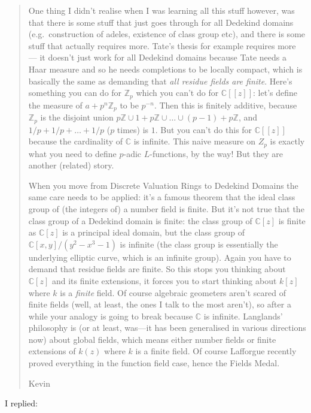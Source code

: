 \documentclass{article}
\begin{document}
\begin{quote}
One thing I didn't realise when I was learning all this stuff however,
was that there is some stuff that just goes through for all Dedekind
domains (e.g.~construction of adeles, existence of class group etc), and
there is some stuff that actually requires more. Tate's thesis for
example requires more --- it doesn't just work for all Dedekind domains
because Tate needs a Haar measure and so he needs completions to be
locally compact, which is basically the same as demanding that \emph{all
residue fields are finite}. Here's something you can do for
\(\mathbb{Z}_p\) which you can't do for \(\mathbb{C}[[z]]\): let's
define the measure of \(a+p^n\mathbb{Z}_p\) to be \(p^{-n}\). Then this
is finitely additive, because \(\mathbb{Z}_p\) is the disjoint union
\(p\mathbb{Z} \cup 1+p\mathbb{Z} \cup\ldots\cup (p-1)+p\mathbb{Z}\), and
\(1/p+1/p+\ldots+1/p\) (\(p\) times) is \(1\). But you can't do this for
\(\mathbb{C}[[z]]\) because the cardinality of \(\mathbb{C}\) is
infinite. This naive measure on \(Z_p\) is exactly what you need to
define \(p\)-adic \(L\)-functions, by the way! But they are another
(related) story.

When you move from Discrete Valuation Rings to Dedekind Domains the same
care needs to be applied: it's a famous theorem that the ideal class
group of (the integers of) a number field is finite. But it's not true
that the class group of a Dedekind domain is finite: the class group of
\(\mathbb{C}[z]\) is finite as \(\mathbb{C}[z]\) is a principal ideal
domain, but the class group of \(\mathbb{C}[x,y]/(y^2-x^3-1)\) is
infinite (the class group is essentially the underlying elliptic curve,
which is an infinite group). Again you have to demand that residue
fields are finite. So this stops you thinking about \(\mathbb{C}[z]\)
and its finite extensions, it forces you to start thinking about
\(k[z]\) where \(k\) is a \emph{finite} field. Of course algebraic
geometers aren't scared of finite fields (well, at least, the ones I
talk to the most aren't), so after a while your analogy is going to
break because \(\mathbb{C}\) is infinite. Langlands' philosophy is (or
at least, was---it has been generalised in various directions now) about
global fields, which means either number fields or finite extensions of
\(k(z)\) where \(k\) is a finite field. Of course Lafforgue recently
proved everything in the function field case, hence the Fields Medal.

Kevin
\end{quote}

I replied:
\end{document}
